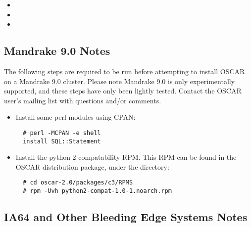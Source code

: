 \begin{itemize}
  \begin{itemize}
  \item {}
  \item {}
  \item {}
  \end{itemize}

\end{itemize}


\subsection{Mandrake 9.0 Notes}
\label{subsec:mdk90notes}

The following steps are required to be run before attempting to
install OSCAR on a Mandrake 9.0 cluster.  Please note Mandrake 9.0 is
only experimentally supported, and these steps have only been lightly
tested.  Contact the OSCAR user's mailing list with questions and/or
comments.

\begin{itemize}
\item Install some perl modules using CPAN:

\begin{verbatim}
  # perl -MCPAN -e shell
  install SQL::Statement
\end{verbatim}
  
\item Install the python 2 compatability RPM.  This RPM can be found
  in the OSCAR distribution package, under the 
  directory:

\begin{verbatim}
  # cd oscar-2.0/packages/c3/RPMS
  # rpm -Uvh python2-compat-1.0-1.noarch.rpm
\end{verbatim}

\end{itemize}


\subsection{IA64 and Other Bleeding Edge Systems Notes}
\label{subsec:ia64notes}

